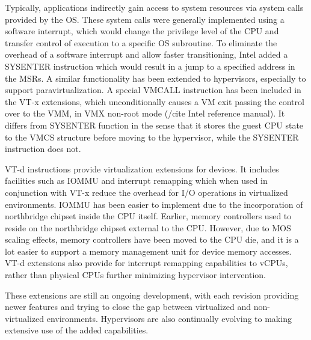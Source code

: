 Typically, applications indirectly gain access to system resources via system calls provided by the OS. These system calls were generally implemented using a software interrupt, which would change the privilege level of the CPU and transfer control of execution to a specific OS subroutine. To eliminate the overhead of a software interrupt and allow faster transitioning, Intel added a SYSENTER instruction which would result in a jump to a specified address in the MSRs. A similar functionality has been extended to hypervisors, especially to support paravirtualization. A special VMCALL instruction has been included in the VT-x extensions, which unconditionally causes a VM exit passing the control over to the VMM, in VMX non-root mode (/cite Intel reference manual). It differs from SYSENTER function in the sense that it stores the guest CPU state to the VMCS structure before moving to the hypervisor, while the SYSENTER instruction does not.  

VT-d instructions provide virtualization extensions for devices. It includes facilities such as IOMMU and interrupt remapping which when used in conjunction with VT-x reduce the overhead for I/O operations in virtualized environments. IOMMU has been easier to implement due to the incorporation of northbridge chipset inside the CPU itself. Earlier, memory controllers used to reside on the northbridge chipset external to the CPU. However, due to MOS scaling effects, memory controllers have been moved to the CPU die, and it is a lot easier to support a memory management unit for device memory accesses. VT-d extensions also provide for interrupt remapping capabilities to vCPUs, rather than physical CPUs further minimizing hypervisor intervention. 

These extensions are still an ongoing development, with each revision providing newer features and trying to close the gap between virtualized and non-virtualized environments. Hypervisors are also continually evolving to making extensive use of the added capabilities.

